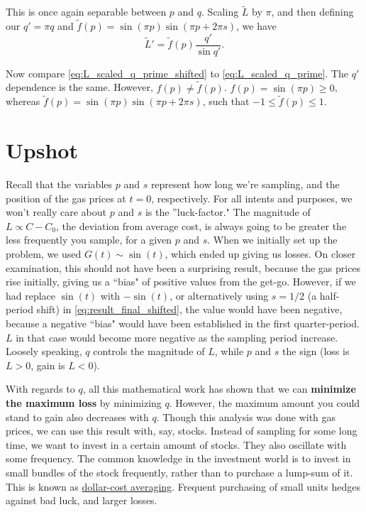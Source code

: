 \documentclass[11pt]{article}
\begin{document}
This is once again separable between $p$ and $q$. Scaling $\tilde{L}$ by $\pi$, and then defining our $q' = \pi q$ and $\tilde{f}(p) = \sin(\pi p) \sin(\pi p + 2\pi s)$, we have
\begin{equation}
\tilde{L}' = \tilde{f}(p)\frac{q'}{\sin q'} .  \label{eq:L_scaled_q_prime_shifted}
\end{equation}

Now compare \eqref{eq:L_scaled_q_prime_shifted} to \eqref{eq:L_scaled_q_prime}. The $q'$ dependence is the same. However, $f(p) \neq \tilde{f}(p)$. $f(p) = \sin (\pi p) \geq 0$, whereas $\tilde{f}(p) = \sin (\pi p) \sin (\pi p + 2\pi s)$, such that $-1 \leq \tilde{f}(p) \leq 1$. 

\section*{Upshot} 
Recall that the variables $p$ and $s$ represent how long we're sampling, and the position of the gas prices at $t=0$, respectively. For all intents and purposes, we won't really care about $p$ and $s$ is the ''luck-factor." The magnitude of $L \propto C - C_0$, the deviation from average cost, is always going to be greater the less frequently you sample, for a given $p$ and $s$. When we initially set up the problem, we used $G(t) \sim \sin (t)$, which ended up giving us losses. On closer examination, this should not have been a surprising result, because the gas prices rise initially, giving us a ``bias" of positive values from the get-go. However, if we had replace $\sin(t)$ with $-\sin(t)$, or alternatively using $s = 1/2$ (a half-period shift) in \eqref{eq:result_final_shifted}, the value would have been negative, because a negative ``bias" would have been established in the first quarter-period. $L$ in that case would become more negative as the sampling period increase. Loosely speaking, $q$ controls the magnitude of $L$, while $p$ and $s$ the sign (loss is $L > 0$, gain is $L < 0$).\\

\par
With regards to $q$, all this mathematical work has shown that we can \textbf{minimize the maximum loss} by minimizing $q$. However, the maximum amount you could stand to gain also decreases with $q$. Though this analysis was done with gas prices, we can use this result with, say, stocks. Instead of sampling for some long time, we want to invest in a certain amount of stocks. They also oscillate with some frequency. The common knowledge in the investment world is to invest in small bundles of the stock frequently, rather than to purchase a lump-sum of it. This is known as \hyperref[https://en.wikipedia.org/wiki/Dollar_cost_averaging]{dollar-cost averaging}. Frequent purchasing of small units hedges against bad luck, and larger losses.\\
\end{document}
